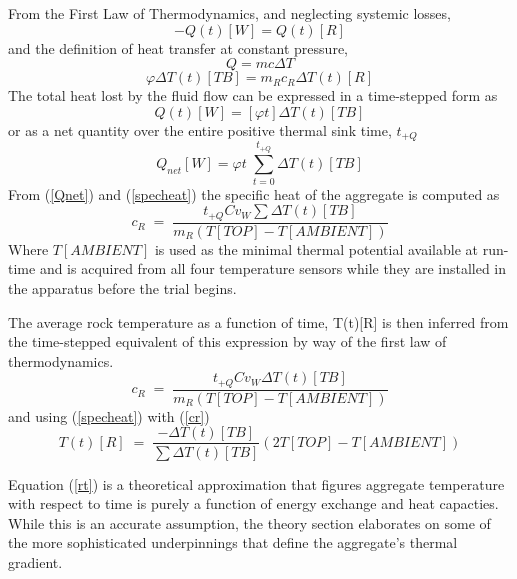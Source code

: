 \noindent From the First Law of Thermodynamics, and neglecting systemic losses,
\[-Q(t)[W]=Q(t)[R]\]
and the definition of heat transfer at constant pressure,
\[Q=mc\Delta T\]
\begin{equation}\label{specheat}
\varphi\Delta T(t)[TB]=m_{R}c_{R}\Delta T(t)[R] 
\end{equation}
The total heat lost by the fluid flow can be expressed in a time-stepped form as
\begin{equation}\label{Qt}
Q(t)[W]=[\varphi t]\Delta T(t)[TB]
\end{equation}
or as a net quantity over the entire positive thermal sink time, $t_{+Q}$
\begin{equation}\label{Qnet}
Q_{net}[W]=\varphi t\;\sum_{t=0}^{t_{+Q}}\Delta T(t)[TB]
\end{equation}
From (\ref{Qnet}) and (\ref{specheat}) the specific heat of the aggregate is computed as
\begin{equation}\label{cr}
c_{R}\;=\;\dfrac{t_{+Q}Cv_{W}\sum\Delta T(t)[TB]}{m_{R}\left(T[TOP]-T[AMBIENT]\right)}
\end{equation}
Where $T[AMBIENT]$ is used as the minimal thermal potential available at run-time and is acquired from all four temperature sensors while they are installed in the apparatus before the trial begins.

The average rock temperature as a function of time, T(t)[R] is then inferred from the time-stepped equivalent of this expression by way of the first law of thermodynamics.
\begin{equation}\label{crt}
c_{R}\;=\;\frac{t_{+Q}Cv_{W}\Delta T(t)[TB]}{m_{R}\left(T[TOP]-T[AMBIENT]\right)}
\end{equation}
and using (\ref{specheat}) with (\ref{cr})
\begin{equation}\label{rt}
T(t)[R]\;=\;\dfrac{-\Delta T(t)[TB]}{\sum\Delta T(t)[TB]}\left(2T[TOP]-T[AMBIENT]\right)
\end{equation}

Equation (\ref{rt}) is a theoretical approximation that figures aggregate temperature with respect to time is purely a function of energy exchange and heat capacties. While this is an accurate assumption, the theory section elaborates on some of the more sophisticated underpinnings that define the aggregate's thermal gradient.


